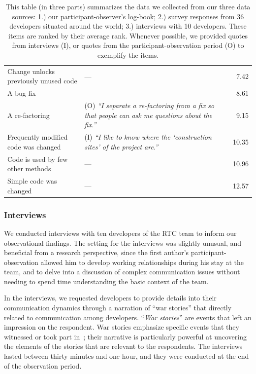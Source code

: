 \documentclass[12pt,oneside]{book}
\begin{document}
\begin{table}[th!]
{\begin{tabular}{l@{\hspace{0pt}}l@{\hspace{-15pt}}r}
Change unlocks previously unused code &--- & 7.42\\%
A bug fix &--- & 8.61\\%
A re-factoring &(O) \emph{``I separate a re-factoring from a fix so that people can ask me questions about the fix.''}& 9.15\\%
Frequently modified code was changed &(I) \emph{``I like to know where the `construction sites' of the project are.''}& 10.35\\%
Code is used by few other methods &--- & 10.96\\%
Simple code was changed\phantom{abcdefgheabcdefghe} &--- & 12.57\\%
\bottomrule
\end{tabular}
\label{tab:sub-technical}
}
\vspace{-10pt}
\caption{This table (in three parts) summarizes the data we collected from our three data sources: 1.) our participant-observer's log-book; 2.) survey responses from 36 developers situated around the world; 3.) interviews with 10 developers.  These items are ranked by their average rank.  Whenever possible, we provided quotes from interviews (I), or quotes from the participant-observation period (O) to exemplify the items.}
\addtocounter{table}{-1}
\label{tab:surveyfactors}
\end{table}

\subsubsection{Interviews}

We conducted interviews with ten developers of the RTC team to inform our observational findings. The setting for the interviews was slightly unusual, and beneficial from a research perspective, since the first author's participant-observation allowed him to develop working relationships during his stay at the team, and to delve into a discussion of complex communication issues without needing to spend time understanding the basic context of the team.

In the interviews, we requested developers to provide details into their communication dynamics through a narration of ``war stories'' that directly related to communication among developers. ``\emph{War stories}'' are events that left an impression on the respondent. War stories emphasize specific events that they witnessed or took part in~\cite{lutters:ist:2007}; their narrative is particularly powerful at uncovering the elements of the stories that are relevant to the respondents. The interviews lasted between thirty minutes and one hour, and they were conducted at the end of the observation period. 
\end{document}
